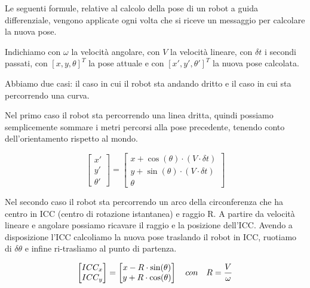 Le seguenti formule, relative al calcolo della pose di un robot a guida differenziale, vengono applicate ogni volta che si riceve un messaggio per calcolare la nuova pose.

Indichiamo con $\omega$ la velocità angolare, con $V$ la velocità lineare, con $\delta t$ i secondi passati, con $[x,y,\theta]^T$ la pose attuale e con $[x',y',\theta']^T$ la nuova pose calcolata.

Abbiamo due casi: il caso in cui il robot sta andando dritto e il caso in cui sta percorrendo una curva.

Nel primo caso il robot sta percorrendo una linea dritta, quindi possiamo semplicemente sommare i metri percorsi alla pose precedente, tenendo conto dell'orientamento rispetto al mondo.

\begin{displaymath}
    \begin{bmatrix} x' \\ y' \\ \theta'  \end{bmatrix}
    =
    \begin{bmatrix} 
        x+\cos(\theta)\cdot(V\cdot\delta t) \\ 
        y+\sin(\theta)\cdot(V\cdot\delta t) \\ 
        \theta  
    \end{bmatrix}
\end{displaymath}

Nel secondo caso il robot sta percorrendo un arco della circonferenza che ha centro in ICC (centro di rotazione istantanea) e raggio R. A partire da velocità lineare e angolare possiamo ricavare il raggio e la posizione dell'ICC. Avendo a disposizione l'ICC calcoliamo la nuova pose traslando il robot in ICC, ruotiamo di $\delta \theta$ e infine ri-trasliamo al punto di partenza.

\begin{displaymath}
    \begin{bmatrix}
        ICC_x \\
        ICC_y \\
    \end{bmatrix}
    =
    \begin{bmatrix}
        x - R \cdot \sin(\theta) \\
        y + R \cdot \cos(\theta) \\
    \end{bmatrix} \\
    \quad con \quad
    R = \frac{V}{\omega}
\end{displaymath}

